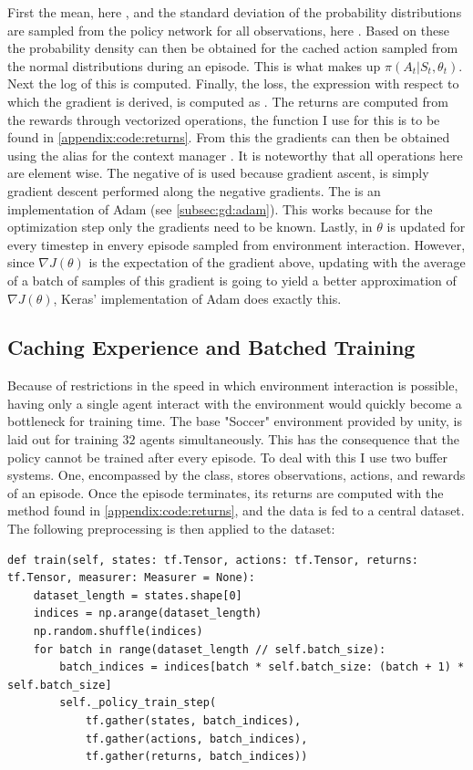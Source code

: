 First the mean, here , and the standard deviation of the probability distributions are sampled from the policy network for all observations, here . Based on these the probability density can then be obtained for the cached action sampled from the normal distributions during an episode. This is what makes up $\pi(A_t | S_t, \theta_t)$. Next the log of this is computed. Finally, the loss, the expression with respect to which the gradient is derived, is computed as . The returns are computed from the rewards through vectorized operations, the function I use for this is to be found in \ref{appendix:code:returns}. From this the gradients  can then be obtained using the alias for the context manager . It is noteworthy that all operations here are element wise. The negative of  is used because gradient ascent, is simply gradient descent performed along the negative gradients. The  is an implementation of Adam (see \ref{subsec:gd:adam}). This works because for the optimization step only the gradients need to be known. Lastly, in  $\theta$ is updated for every timestep in envery episode sampled from environment interaction. However, since $\nabla J(\theta)$ is the expectation of the gradient above, updating with the average of a batch of samples of this gradient is going to yield a better approximation of $\nabla J(\theta)$, Keras' implementation of Adam does exactly this. 

\subsection{Caching Experience and Batched Training}\label{subsec:ip:agent:archive}
Because of restrictions in the speed in which environment interaction is possible, having only a single agent interact with the environment would quickly become a bottleneck for training time. The base "Soccer" environment provided by unity, is laid out for training $32$ agents simultaneously. This has the consequence that the policy cannot be trained after every episode. To deal with this I use two buffer systems. One, encompassed by the  class, stores observations, actions, and rewards of an episode. Once the episode terminates, its returns are computed with the method found in \ref{appendix:code:returns}, and the data is fed to a central dataset. The following preprocessing is then applied to the dataset:

\begin{lstlisting}[basicstyle=\footnotesize]
def train(self, states: tf.Tensor, actions: tf.Tensor, returns: tf.Tensor, measurer: Measurer = None):
    dataset_length = states.shape[0]
    indices = np.arange(dataset_length)
    np.random.shuffle(indices)
    for batch in range(dataset_length // self.batch_size):
        batch_indices = indices[batch * self.batch_size: (batch + 1) * self.batch_size]
        self._policy_train_step(
            tf.gather(states, batch_indices),
            tf.gather(actions, batch_indices),
            tf.gather(returns, batch_indices))
\end{lstlisting}

